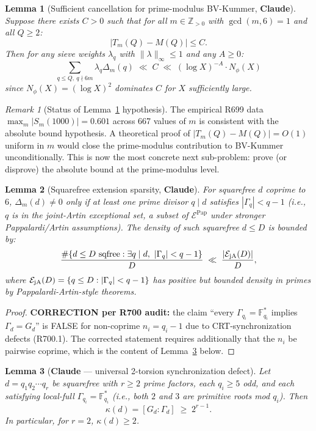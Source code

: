 \documentclass[12pt]{amsart}
\newtheorem{lemma}{Lemma}
\theoremstyle{definition}
\theoremstyle{remark}
\newtheorem{remark}{Remark}
\begin{document}
\begin{lemma}[Sufficient cancellation for prime-modulus BV-Kummer, \textbf{Claude}]\label{lem:Claude-BV-sufficient}
Suppose there exists $C > 0$ such that for all $m \in \mathbb{Z}_{> 0}$ with $\gcd(m, 6) = 1$ and all $Q \ge 2$:
$$
|T_m(Q) - M(Q)| \le C.
$$
Then for any sieve weights $\lambda_q$ with $\|\lambda\|_\infty \le 1$ and any $A \ge 0$:
$$
\sum_{q \le Q,\ q \nmid 6m} \lambda_q \Delta_m(q)
\;\ll\;
C \;\ll\; (\log X)^{-A} \cdot N_\phi(X)
$$
since $N_\phi(X) = (\log X)^2$ dominates $C$ for $X$ sufficiently large.
\end{lemma}

\begin{remark}[Status of Lemma~\ref{lem:Claude-BV-sufficient} hypothesis]
The empirical R699 data $\max_m |S_m(1000)| = 0.601$ across 667 values of $m$ is consistent with the absolute bound hypothesis. A theoretical proof of $|T_m(Q) - M(Q)| = O(1)$ uniform in $m$ would close the prime-modulus contribution to BV-Kummer unconditionally. This is now the most concrete next sub-problem: prove (or disprove) the absolute bound at the prime-modulus level.
\end{remark}

\begin{lemma}[Squarefree extension sparsity, \textbf{Claude}]\label{lem:Claude-sqfree-sparse}
For squarefree $d$ coprime to $6$, $\Delta_m(d) \neq 0$ only if at least one prime divisor $q \mid d$ satisfies $|\Gamma_q| < q - 1$ (i.e., $q$ is in the joint-Artin exceptional set, a subset of $\mathcal{E}^{\mathrm{Pap}}$ under stronger Pappalardi/Artin assumptions). The density of such squarefree $d \le D$ is bounded by:
$$
\frac{\# \{d \le D \text{ sqfree} : \exists q \mid d,\ |\Gamma_q| < q - 1\}}{D}
\;\ll\;
\frac{|\mathcal{E}_{\rm jA}(D)|}{D},
$$
where $\mathcal{E}_{\rm jA}(D) = \{q \le D : |\Gamma_q| < q - 1\}$ has positive but bounded density in primes by Pappalardi-Artin-style theorems.
\end{lemma}

\begin{proof}
\textbf{CORRECTION per R700 audit:} the claim ``every $\Gamma_{q_i} = \mathbb{F}_{q_i}^*$ implies $\Gamma_d = G_d$'' is FALSE for non-coprime $n_i = q_i - 1$ due to CRT-synchronization defects (R700.1). The corrected statement requires additionally that the $n_i$ be pairwise coprime, which is the content of Lemma~\ref{lem:Claude-2-torsion} below.
\end{proof}

\begin{lemma}[\textbf{Claude} — universal 2-torsion synchronization defect]\label{lem:Claude-2-torsion}
Let $d = q_1 q_2 \cdots q_r$ be squarefree with $r \ge 2$ prime factors, each $q_i \ge 5$ odd, and each satisfying local-full $\Gamma_{q_i} = \mathbb{F}_{q_i}^*$ (i.e., both $2$ and $3$ are primitive roots mod $q_i$). Then
$$
\kappa(d) = [G_d : \Gamma_d] \;\ge\; 2^{r - 1}.
$$
In particular, for $r = 2$, $\kappa(d) \ge 2$.
\end{lemma}
\end{document}
